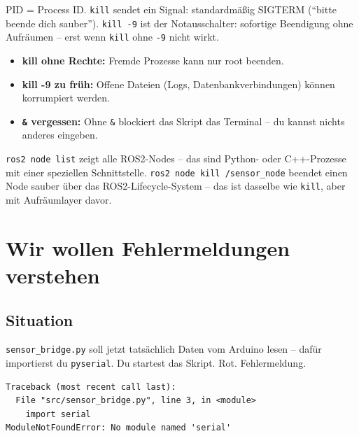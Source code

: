 \begin{merksatzBox}
PID = Process ID. \texttt{kill} sendet ein Signal: standardmäßig
SIGTERM (\enquote{bitte beende dich sauber}). \texttt{kill -9}
ist der Notausschalter: sofortige Beendigung ohne Aufräumen --
erst wenn \texttt{kill} ohne \texttt{-9} nicht wirkt.
\end{merksatzBox}

\begin{fehlerBox}
\begin{itemize}
  \item \textbf{kill ohne Rechte:} Fremde Prozesse kann nur root beenden.
  \item \textbf{kill -9 zu früh:} Offene Dateien (Logs, Datenbankverbindungen)
        können korrumpiert werden.
  \item \textbf{\texttt{\&} vergessen:} Ohne \texttt{\&} blockiert das Skript
        das Terminal -- du kannst nichts anderes eingeben.
\end{itemize}
\end{fehlerBox}

\begin{robotikBox}
\texttt{ros2 node list} zeigt alle ROS2-Nodes -- das sind Python-
oder C++-Prozesse mit einer speziellen Schnittstelle.
\texttt{ros2 node kill /sensor\_node} beendet einen Node sauber
über das ROS2-Lifecycle-System -- das ist dasselbe wie
\texttt{kill}, aber mit Aufräumlayer davor.
\end{robotikBox}

\chapter{Wir wollen Fehlermeldungen verstehen}

\kapitelstruktur

\section{Situation}

\texttt{sensor\_bridge.py} soll jetzt tatsächlich Daten vom
Arduino lesen -- dafür importierst du \texttt{pyserial}.
Du startest das Skript. Rot. Fehlermeldung.

\begin{lstlisting}[style=text]
Traceback (most recent call last):
  File "src/sensor_bridge.py", line 3, in <module>
    import serial
ModuleNotFoundError: No module named 'serial'
\end{lstlisting}

